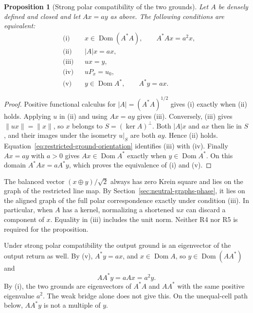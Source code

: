 \documentclass[11pt]{article}
\newtheorem{proposition}{Proposition}[section]
\theoremstyle{definition}
\begin{document}
\begin{proposition}[Strong polar compatibility of the two grounds]
\label{prop:ground-polar-compatibility}
Let $A$ be densely defined and closed and let $Ax=ay$ as above. The following conditions are equivalent:
\begin{align*}
 &\text{(i)}   &&x\in\operatorname{Dom}(A^*A),\qquad A^*Ax=a^2x,\\
 &\text{(ii)}  &&|A|x=ax,\\
 &\text{(iii)} &&ux=y,\\
 &\text{(iv)}  &&uP_x=u_0,\\
 &\text{(v)}   &&y\in\operatorname{Dom}A^*,\qquad A^*y=ax .
\end{align*}
\end{proposition}
\begin{proof}
Positive functional calculus for $|A|=(A^*A)^{1/2}$ gives (i) exactly when (ii) holds. Applying $u$ in (ii) and using $Ax=ay$ gives (iii). Conversely, (iii) gives $\|ux\|=\|x\|$, so $x$ belongs to $S=(\ker A)^\perp$. Both $|A|x$ and $ax$ then lie in $S$, and their images under the isometry $u|_S$ are both $ay$. Hence (ii) holds. Equation~\eqref{eq:restricted-ground-orientation} identifies (iii) with (iv). Finally $Ax=ay$ with $a>0$ gives $Ax\in\operatorname{Dom}A^*$ exactly when $y\in\operatorname{Dom}A^*$. On this domain $A^*Ax=aA^*y$, which proves the equivalence of (i) and (v).
\end{proof}

The balanced vector $(x\oplus y)/\sqrt2$ always has zero Krein square and lies on the graph of the restricted line map. By Section~\ref{sec:neutral-graphs-phase}, it lies on the aligned graph of the full polar correspondence exactly under condition (iii). In particular, when $A$ has a kernel, normalizing a shortened $ux$ can discard a component of $x$. Equality in (iii) includes the unit norm. Neither R4 nor R5 is required for the proposition.

Under strong polar compatibility the output ground is an eigenvector of the output return as well. By (v), $A^*y=ax$, and $x\in\operatorname{Dom}A$, so $y\in\operatorname{Dom}(AA^*)$ and
\begin{equation}
 AA^*y=aAx=a^2y .
 \label{eq:ground-output-return}
\end{equation}
By (i), the two grounds are eigenvectors of $A^*A$ and $AA^*$ with the same positive eigenvalue $a^2$. The weak bridge alone does not give this. On the unequal-cell path below, $AA^*y$ is not a multiple of $y$.
\end{document}
